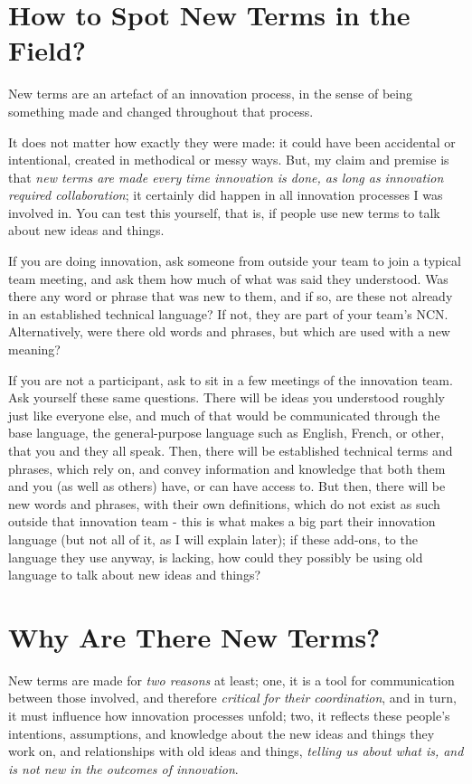 \documentclass[graybox,envcountchap,sectrefs]{svmono}
\newcommand{\ncn}{NCN}
\begin{document}
\section{How to Spot New Terms in the Field?}
\label{c1-s3}
New terms are an artefact of an innovation process, in the sense of being something made and changed throughout that process. 

It does not matter how exactly they were made: it could have been accidental or intentional, created in methodical or messy ways. But, my claim and premise is that \textit{new terms are made every time innovation is done, as long as innovation required collaboration}; it certainly did happen in all innovation processes I was involved in. You can test this yourself, that is, if people use new terms to talk about new ideas and things. 

If you are doing innovation, ask someone from outside your team to join a typical team meeting, and ask them how much of what was said they understood. Was there any word or phrase that was new to them, and if so, are these not already in an established technical language? If not, they are part of your team's \ncn. Alternatively, were there old words and phrases, but which are used with a new meaning?

If you are not a participant, ask to sit in a few meetings of the innovation team. Ask yourself these same questions. There will be ideas you understood roughly just like everyone else, and much of that would be communicated through the base language, the general-purpose language such as English, French, or other, that you and they all speak. Then, there will be established technical terms and phrases, which rely on, and convey information and knowledge that both them and you (as well as others) have, or can have access to. But then, there will be new words and phrases, with their own definitions, which do not exist as such outside that innovation team - this is what makes a big part their innovation language (but not all of it, as I will explain later); if these add-ons, to the language they use anyway, is lacking, how could they possibly be using old language to talk about new ideas and things?

\section{Why Are There New Terms?}
\label{c1-s4}
New terms are made for \textit{two reasons} at least; one, it is a tool for communication between those involved, and therefore \textit{critical for their coordination}, and in turn, it must influence how innovation processes unfold; two, it reflects these people's intentions, assumptions, and knowledge about the new ideas and things they work on, and relationships with old ideas and things, \textit{telling us about what is, and is not new in the outcomes of innovation}.
\end{document}
